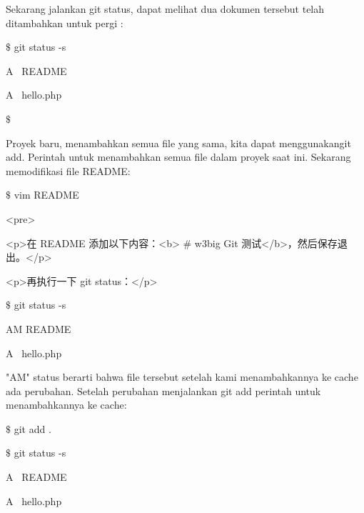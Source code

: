 \vspace{12pt}
\hspace*{0.5in} Sekarang jalankan git status, dapat melihat dua dokumen tersebut telah ditambahkan untuk pergi : \par
\noindent 
{\fontsize{10pt}{10pt}\selectfont  $  \$  $ git status -s} \par
\noindent 
{\fontsize{10pt}{10pt}\selectfont A~ README} \par
\noindent 
{\fontsize{10pt}{10pt}\selectfont A~ hello.php} \par
\noindent 
{\fontsize{10pt}{10pt}\selectfont  $  \$  $ } \par

\vspace{12pt}
\hspace*{0.5in} Proyek baru, menambahkan semua file yang sama, kita dapat menggunakangit add. Perintah untuk menambahkan semua file dalam proyek saat ini. Sekarang memodifikasi file README:   \par
\noindent 
{\fontsize{10pt}{10pt}\selectfont  $  \$  $ vim README} \par
\noindent 
{\fontsize{10pt}{10pt}\selectfont <pre>} \par
\noindent 
{\fontsize{10pt}{10pt}\selectfont <p>在 README 添加以下内容：<b> $  \#  $ w3big Git 测试</b>，然后保存退出。</p>} \par
\noindent 
{\fontsize{10pt}{10pt}\selectfont <p>再执行一下 git status：</p>} \par
\noindent 
{\fontsize{10pt}{10pt}\selectfont  $  \$  $ git status -s} \par
\noindent 
{\fontsize{10pt}{10pt}\selectfont AM README} \par
\noindent 
{\fontsize{10pt}{10pt}\selectfont A~ hello.php} \par
\vspace{12pt}
\hspace*{0.5in}"AM" status berarti bahwa file tersebut setelah kami menambahkannya ke cache ada perubahan. Setelah perubahan menjalankan git add perintah untuk menambahkannya ke cache: \par
\noindent 
{\fontsize{10pt}{10pt}\selectfont  $  \$  $ git add .} \par
\noindent 
{\fontsize{10pt}{10pt}\selectfont  $  \$  $ git status -s} \par
\noindent 
{\fontsize{10pt}{10pt}\selectfont A~ README} \par
\noindent 
{\fontsize{10pt}{10pt}\selectfont A~ hello.php} \par
